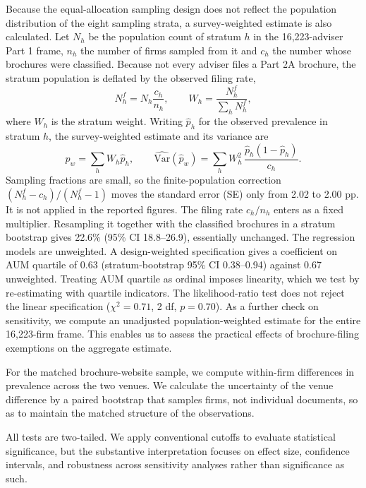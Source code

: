 \documentclass[utf8]{FrontiersinHarvard}
\begin{document}
Because the equal-allocation sampling design does not reflect the population distribution of the eight sampling strata, a survey-weighted estimate is also calculated. Let $N_h$ be the population count of stratum $h$ in the 16{,}223-adviser Part 1 frame, $n_h$ the number of firms sampled from it and $c_h$ the number whose brochures were classified. Because not every adviser files a Part 2A brochure, the stratum population is deflated by the observed filing rate,
\begin{equation}
N^{f}_h = N_h \frac{c_h}{n_h}, \qquad W_h = \frac{N^{f}_h}{\sum_h N^{f}_h},
\label{eq:weights}
\end{equation}
where $W_h$ is the stratum weight. Writing $\hat{p}_h$ for the observed prevalence in stratum $h$, the survey-weighted estimate and its variance are
\begin{equation}
\hat{p}_w = \sum_h W_h \hat{p}_h, \qquad
\widehat{\mathrm{Var}}(\hat{p}_w) = \sum_h W_h^{2}\,\frac{\hat{p}_h(1-\hat{p}_h)}{c_h}.
\label{eq:weighted}
\end{equation}
Sampling fractions are small, so the finite-population correction $(N^{f}_h - c_h)/(N^{f}_h - 1)$ moves the standard error (SE) only from 2.02 to 2.00 pp. It is not applied in the reported figures. The filing rate $c_h / n_h$ enters as a fixed multiplier. Resampling it together with the classified brochures in a stratum bootstrap gives 22.6\% (95\% CI 18.8--26.9), essentially unchanged. The regression models are unweighted. A design-weighted specification gives a coefficient on AUM quartile of 0.63 (stratum-bootstrap 95\% CI 0.38--0.94) against 0.67 unweighted. Treating AUM quartile as ordinal imposes linearity, which we test by re-estimating with quartile indicators. The likelihood-ratio test does not reject the linear specification ($\chi^2 = 0.71$, 2 df, $p = 0.70$). As a further check on sensitivity, we compute an unadjusted population-weighted estimate for the entire 16{,}223-firm frame. This enables us to assess the practical effects of brochure-filing exemptions on the aggregate estimate.

For the matched brochure-website sample, we compute within-firm differences in prevalence across the two venues. We calculate the uncertainty of the venue difference by a paired bootstrap that samples firms, not individual documents, so as to maintain the matched structure of the observations.

All tests are two-tailed. We apply conventional cutoffs to evaluate statistical significance, but the substantive interpretation focuses on effect size, confidence intervals, and robustness across sensitivity analyses rather than significance as such.
\end{document}
